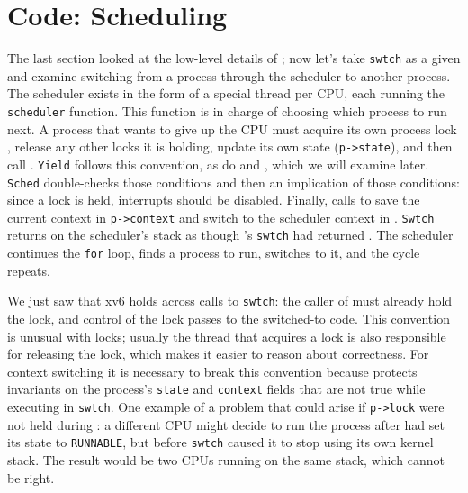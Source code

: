 \section{Code: Scheduling}

The last section looked at the low-level details of
;
now let's take 
\lstinline{swtch}
as a given and examine 
switching from a process through the scheduler to another process.
The scheduler exists in the form of a special thread per CPU, each running the
\lstinline{scheduler}
function.
This function is in charge of choosing which process to run next.
A process
that wants to give up the CPU must
acquire its own process lock
,
release any other locks it is holding,
update its own state
(\lstinline{p->state}),
and then call
.
\lstinline{Yield}
follows this convention, as do
and
,
which we will examine later.
\lstinline{Sched}
double-checks those conditions
and then an implication of those conditions:
since a lock is held, interrupts should be disabled.
Finally,
calls
to save the current context in 
\lstinline{p->context}
and switch to the scheduler context in
.
\lstinline{Swtch}
returns on the scheduler's stack
as though
's
\lstinline{swtch}
had returned
.
The scheduler continues the 
\lstinline{for}
loop, finds a process to run, 
switches to it, and the cycle repeats.

We just saw that xv6 holds
across calls to
\lstinline{swtch}:
the caller of
must already hold the lock, and control of the lock passes to the
switched-to code.  This convention is unusual with locks; usually
the thread that acquires a lock is also responsible for
releasing the lock, which makes it easier to reason about correctness.
For context switching it is necessary to break this convention because
protects invariants on the process's
\lstinline{state}
and
\lstinline{context}
fields that are not true while executing in
\lstinline{swtch}.
One example of a problem that could arise if
\lstinline{p->lock}
were not held during
:
a different CPU might decide
to run the process after 
had set its state to
\lstinline{RUNNABLE},
but before 
\lstinline{swtch}
caused it to stop using its own kernel stack.
The result would be two CPUs running on the same stack,
which cannot be right.

